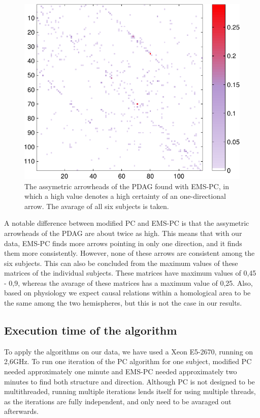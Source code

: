 \documentclass[a4paper, 10pt, english, onecolumn]{article}
\begin{document}
\begin{figure}[h!]
  \centering
  \includegraphics{images/arrowheads_avg_expl}
  \caption{The assymetric arrowheads of the PDAG found with EMS-PC, in which a high value denotes a high certainty of an one-directional arrow. The avarage of all six subjects is taken.}
  \label{fig:pdag_avg_antisymmetric_ems}
\end{figure}


A notable difference between modified PC and EMS-PC is that the assymetric arrowheads of the PDAG are about twice as high. %
This means that with our data, EMS-PC finds more arrows pointing in only one direction, and it finds them more consistently.
However, none of these arrows are consistent among the six subjects.
This can also be concluded from the maximum values of these matrices of the individual subjects.
These matrices have maximum values of 0,45 - 0,9, whereas the avarage of these matrices has a maximum value of 0,25.
Also, based on physiology we expect causal relations within a homological area to be the same among the two hemispheres, but this is not the case in our results.

\subsection{Execution time of the algorithm}
To apply the algorithms on our data, we have used a Xeon E5-2670, running on 2,6GHz.
To run one iteration of the PC algorithm for one subject, modified PC needed approximately one minute and EMS-PC needed approximately two minutes to find both structure and direction.
Although PC is not designed to be multithreaded, running multiple iterations lends itself for using multiple threads, as the iterations are fully independent, and only need to be avaraged out afterwards.
\end{document}
